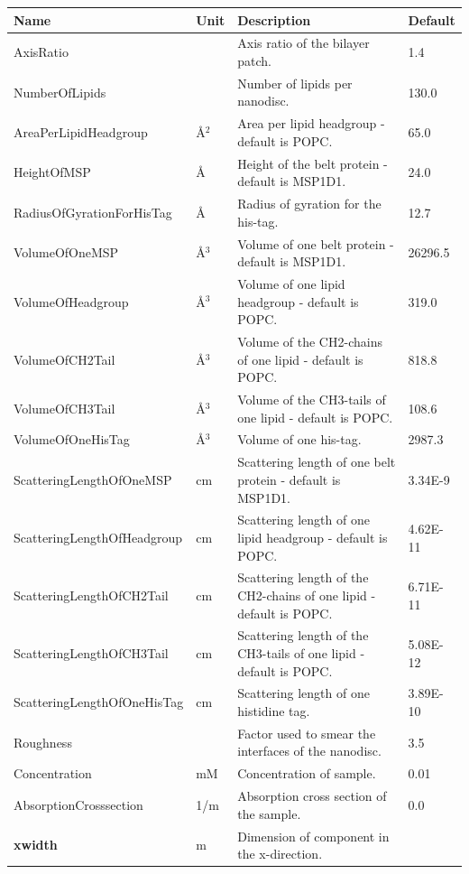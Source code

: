\begin{longtable}{p{}p{}p{}p{}}
\toprule
\textbf{Name} & \textbf{Unit} & \textbf{Description} & \textbf{Default} \\
\midrule
\endhead
AxisRatio &  & Axis ratio of the bilayer patch. & 1.4 \\
NumberOfLipids &  & Number of lipids per nanodisc. & 130.0 \\
AreaPerLipidHeadgroup & \AA{}$^{2}$ & Area per lipid headgroup - default is POPC. & 65.0 \\
HeightOfMSP & \AA{} & Height of the belt protein - default is MSP1D1. & 24.0 \\
RadiusOfGyrationForHisTag & \AA{} & Radius of gyration for the his-tag. & 12.7 \\
VolumeOfOneMSP & \AA{}$^{3}$ & Volume of one belt protein - default is MSP1D1. & 26296.5 \\
VolumeOfHeadgroup & \AA{}$^{3}$ & Volume of one lipid headgroup - default is POPC. & 319.0 \\
VolumeOfCH2Tail & \AA{}$^{3}$ & Volume of the CH2-chains of one lipid - default is POPC. & 818.8 \\
VolumeOfCH3Tail & \AA{}$^{3}$ & Volume of the CH3-tails of one lipid - default is POPC. & 108.6 \\
VolumeOfOneHisTag & \AA{}$^{3}$ & Volume of one his-tag. & 2987.3 \\
ScatteringLengthOfOneMSP & cm & Scattering length of one belt protein - default is MSP1D1. & 3.34E-9 \\
ScatteringLengthOfHeadgroup & cm & Scattering length of one lipid headgroup - default is POPC. & 4.62E-11 \\
ScatteringLengthOfCH2Tail & cm & Scattering length of the CH2-chains of one lipid - default is POPC. & 6.71E-11 \\
ScatteringLengthOfCH3Tail & cm & Scattering length of the CH3-tails of one lipid - default is POPC. & 5.08E-12 \\
ScatteringLengthOfOneHisTag & cm & Scattering length of one histidine tag. & 3.89E-10 \\
Roughness &  & Factor used to smear the interfaces of the nanodisc. & 3.5 \\
Concentration & mM & Concentration of sample. & 0.01 \\
AbsorptionCrosssection & 1/m & Absorption cross section of the sample. & 0.0 \\
\textbf{xwidth} & m & Dimension of component in the x-direction. &  \\

\end{longtable}
